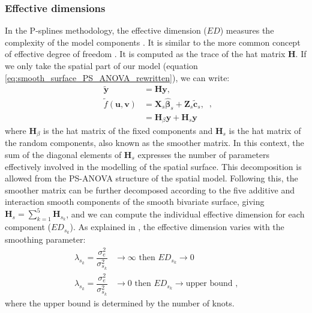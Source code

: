 \subsubsection{Effective dimensions}
In the P-splines methodology, the effective dimension ($ED$) measures the complexity of the model components \parencite{eilers_twenty_2015}. It is similar to the more common concept of effective degree of freedom \parencite{buja1989linear}. It is computed as the trace of the hat matrix $\mathbf{H}$. If we only take the spatial part of our model (equation \ref{eq:smooth_surface_PS_ANOVA_rewritten}), we can write:
\begin{equation}
	\begin{aligned}
		\tilde{\mathbf{y}} &= \mathbf{Hy} \text{,} \\
		\tilde{f}(\mathbf{u},\mathbf{v}) &= \boldsymbol{X}_{s} \hat{\boldsymbol{\beta}}_{s}+
											\boldsymbol{Z}_{s} \tilde{\boldsymbol{c}}_{s} \text{,} \\
			&= \mathbf{H}_{\beta}\mathbf{y} + \mathbf{H}_{s}\mathbf{y}
	\end{aligned}
	\text{ ,}
\end{equation}
where $\mathbf{H}_{\beta}$ is the hat matrix of the fixed components and $\mathbf{H}_{s}$ is the hat matrix of the random components, also known as the smoother matrix. In this context, the sum of the diagonal elements of $\mathbf{H}_{s}$ expresses the number of parameters effectively involved in the modelling of the spatial surface. This decomposition is allowed from the PS-ANOVA structure of the spatial model. Following this, the smoother matrix can be further decomposed according to the five additive and interaction smooth components of the smooth bivariate surface, giving $\mathbf{H}_{s} = \sum_{k=1}^{5} \mathbf{H}_{s_{k}}$, and we can compute the individual effective dimension for each component ($ED_{s_{k}}$). As explained in \textcite{rodriguez-alvarez_spatial_2016}, the effective dimension varies with the smoothing parameter:
\begin{equation}
	\begin{aligned}
		\lambda_{s_{k}} = \dfrac{\sigma^2_{e}}{\sigma^2_{s_{k}}} & \rightarrow \infty \text{  then  } ED_{s_{k}} \rightarrow 0 \\
		\lambda_{s_{k}} = \dfrac{\sigma^2_{e}}{\sigma^2_{s_{k}}} & \rightarrow 0 \text{  then  } ED_{s_{k}} \rightarrow 
			\text{upper bound}\text{ ,}
	\end{aligned}
\end{equation}
where the upper bound is determined by the number of knots.
\\

